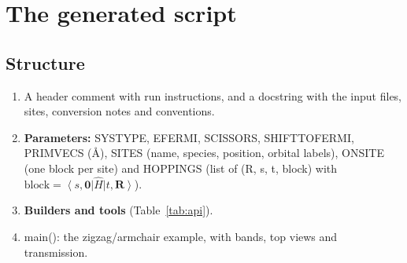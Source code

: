 \documentclass[11pt,a4paper]{article}
\newcommand{\code}[1]{{\ttfamily\def\_{\textunderscore\allowbreak}\def\slash{/\allowbreak}#1}}
\newcommand{\ket}[1]{\left|#1\right\rangle}
\newcommand{\bra}[1]{\left\langle#1\right|}
\begin{document}
\section{The generated script}

\subsection{Structure}
\begin{enumerate}[nosep]
  \item A header comment with run instructions, and a docstring with the input files,
        sites, conversion notes and conventions.
  \item \textbf{Parameters:} \code{SYSTYPE}, \code{EFERMI}, \code{SCISSORS},
        \code{SHIFT\_TO\_FERMI}, \code{PRIM\_VECS} (\AA), \code{SITES} (name, species,
        position, orbital labels), \code{ONSITE} (one block per site) and
        \code{HOPPINGS} (list of \code{(R, s, t, block)} with
        $\text{block}=\bra{s,\mathbf{0}}\hat H\ket{t,\mathbf{R}}$).
  \item \textbf{Builders and tools} (Table~\ref{tab:api}).
  \item \code{main()}: the zigzag/armchair example, with bands, top views and transmission.
\end{enumerate}
\end{document}
